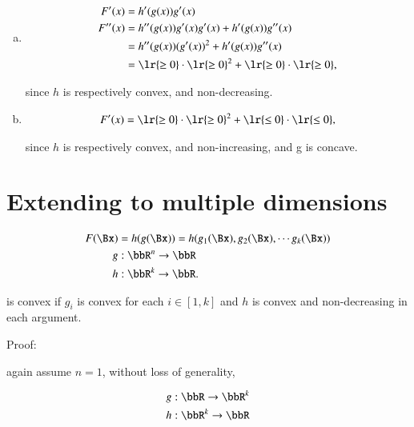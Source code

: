 \begin{enumerate}[(a)]
\item
\begin{dmath}\label{eqn:convexOptimizationLecture8:180}
\begin{aligned}
F'(x) &= h'(g(x)) g'(x) \\
F''(x) &=
h''(g(x)) g'(x) g'(x)
+
h'(g(x)) g''(x) \\
&=
h''(g(x)) (g'(x))^2
+
h'(g(x)) g''(x) \\
&= 
\lr{ \ge 0 } \cdot \lr{ \ge 0 }^2 + \lr{ \ge 0 } \cdot \lr{ \ge 0 },
\end{aligned}
\end{dmath}

since \( h \) is respectively convex, and non-decreasing.
\item

\begin{dmath}\label{eqn:convexOptimizationLecture8:180b}
\begin{aligned}
F'(x) = 
\lr{ \ge 0 } \cdot \lr{ \ge 0 }^2 + \lr{ \le 0 } \cdot \lr{ \le 0 },
\end{aligned}
\end{dmath}

since \( h \) is respectively convex, and non-increasing, and g is concave.
\end{enumerate}

\section{Extending to multiple dimensions}

\begin{dmath}\label{eqn:convexOptimizationLecture8:200}
\begin{aligned}
F(\Bx)
&= h(g(\Bx))
= h( g_1(\Bx), g_2(\Bx), \cdots g_k(\Bx) ) \\
g &: \bbR^n \rightarrow \bbR \\
h &: \bbR^k \rightarrow \bbR.
\end{aligned}
\end{dmath}

is convex if \( g_i \) is convex for each \( i \in [1,k] \) and \( h \) is convex and non-decreasing in each argument.

Proof:

again assume \( n = 1 \), without loss of generality,

\begin{dmath}\label{eqn:convexOptimizationLecture8:220}
\begin{aligned}
g &: \bbR \rightarrow \bbR^k \\
h &: \bbR^k \rightarrow \bbR \\
\end{aligned}
\end{dmath}

